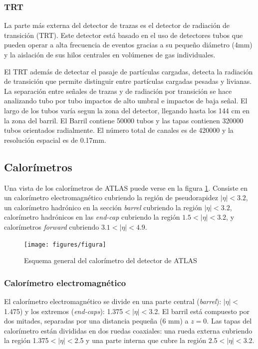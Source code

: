 \subsubsection{TRT}
La parte más externa del detector de trazas es el detector de radiación de transición (TRT).
Este detector está basado en el uso de detectores tubos que pueden operar a alta frecuencia de eventos gracias a su pequeño diámetro (4mm) y la aislación de sus hilos centrales en volúmenes de gas individuales.

El TRT además de detectar el pasaje de partículas cargadas, detecta la radiación de transición que permite distinguir entre partículas cargadas pesadas y livianas.
La separación entre señales de trazas y de radiación por transición se hace analizando tubo por tubo impactos de alto umbral e impactos de baja señal.
El largo de los tubos varía segun la zona del detector, llegando hasta los 144 cm en la zona del barril.
El Barril contiene 50000 tubos y las tapas contienen 320000 tubos orientados radialmente. El número total de canales es de 420000 y la resolución espacial es de 0.17mm.


\subsection{Calorímetros}

Una vista de los calorímetros de ATLAS puede verse en la figura \ref{fig:calo}. Consiste en un calorímetro electromagnético cubriendo la región de pseudorapidez $|\eta| < 3.2$, un calorímetro hadrónico en la sección \emph{barrel} cubriendo la región $|\eta| < 3.2$, calorímetro hadrónicos en las \emph{end-cap} cubriendo la región $1.5 < |\eta| < 3.2$, y calorímetros \emph{forward} cubriendo $3.1 < |\eta| < 4.9$.

\begin{figure}[H]
  \centering
  \texttt{[image: figures/figura]}
  \caption{Esquema general del calorímetro del detector de ATLAS}\label{fig:calo}
\end{figure}


\subsubsection{Calorímetro electromagnético}
El calorímetro electromagnético \cite{caloemTDR} se divide en una parte central
(\emph{barrel}): $|\eta|<$1.475) y los extremos (\emph{end-caps}): 1.375$<|\eta|<$3.2.
El barril está compuesto por dos mitades, separadas por una distancia pequeña (6 mm) a $z = 0$.
Las tapas del calorímetro están divididas en dos ruedas coaxiales: una rueda
externa cubriendo la región 1.375$<|\eta|<$2.5 y una parte interna que cubre la
región 2.5$<|\eta|<$3.2.

